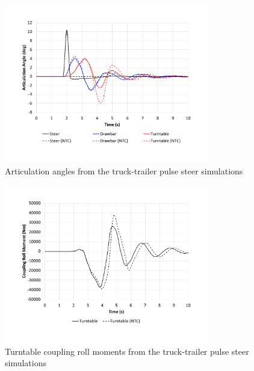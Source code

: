 \begin{figure}[H]
	\centering
	\includegraphics[width=0.8\textwidth]{fig/ntc-truck-trailer_psd}
	\caption{Articulation angles from the truck-trailer pulse steer simulations}
	\label{figure:ntc-truck-trailer_psd}
\end{figure}

\begin{figure}[H]
	\centering
	\includegraphics[width=0.8\textwidth]{fig/ntc-truck-trailer_pse}
	\caption{Turntable coupling roll moments from the truck-trailer pulse steer simulations}
	\label{figure:ntc-truck-trailer_pse}
\end{figure}

